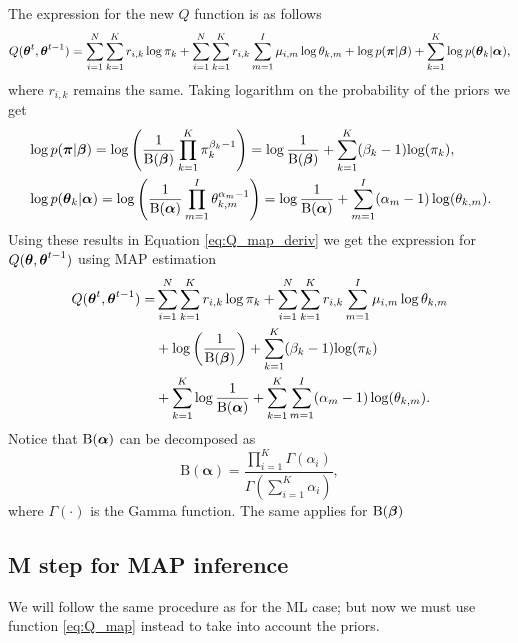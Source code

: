 \documentclass[12pt]{article}
\begin{document}
\noindent The expression for the new $Q$ function is as follows
\begin{equation}\label{eq:Q_map_deriv}
Q(\boldsymbol\theta^t, \boldsymbol\theta^{t-1}) = \sum_{i=1}^N\sum_{k=1}^K r_{i,k}\log \pi_k + \sum_{i=1}^N\sum_{k=1}^K r_{i,k}\sum_{m=1}^I \mu_{i,m}\log \theta_{k,m} + \log p(\boldsymbol\pi|\boldsymbol\beta) + \sum\limits_{k=1}^{K}\log p(\boldsymbol\theta_k|\boldsymbol\alpha),
\end{equation}
where $r_{i,k}$ remains the same. Taking logarithm on the probability of the priors we get
\begin{align}
& \log p(\boldsymbol\pi|\boldsymbol\beta) = \log \left (\dfrac{1}{\text{B}(\boldsymbol\beta)} \prod \limits_{k=1}^{K} \pi_{k}^{\beta_{k}-1} \right )= \log \dfrac{1}{\text{B}(\boldsymbol\beta)} + \sum \limits_{k=1}^{K}(\beta_{k}-1)\text{log}(\pi_{k}),\\
& \log p(\boldsymbol\theta_{k}|\boldsymbol\alpha) = \log \left(\dfrac{1}{\text{B}(\boldsymbol\alpha)} \prod \limits_{m=1}^{I} \theta_{k,m}^{\alpha_{m}-1}\right) = \log \dfrac{1}{\text{B}(\boldsymbol\alpha)} +  \sum \limits_{m=1}^{I}(\alpha_{m}-1)\log (\theta_{k,m}).
\end{align}
\noindent Using these results in Equation \ref{eq:Q_map_deriv} we get the expression for $Q(\boldsymbol\theta,\boldsymbol\theta^{t-1})$ using MAP estimation
\begin{equation}\label{eq:Q_map}
\begin{split}
Q(\boldsymbol\theta^t, \boldsymbol\theta^{t-1}) = & \sum_{i=1}^N\sum_{k=1}^K r_{i,k}\log \pi_k + \sum_{i=1}^N\sum_{k=1}^K r_{i,k}\sum_{m=1}^I \mu_{i,m}\log \theta_{k,m} \\
& + \log \left(\dfrac{1}{\text{B}(\boldsymbol\beta)}\right) + \sum \limits_{k=1}^{K}(\beta_{k}-1)\text{log}(\pi_{k})\\
 & + \sum\limits_{k=1}^{K} \log \dfrac{1}{\text{B}(\boldsymbol\alpha)} +  \sum\limits_{k=1}^{K}\sum \limits_{m=1}^{I}(\alpha_{m}-1)\log (\theta_{k,m}).
\end{split}
\end{equation}
Notice that $\text{B}(\boldsymbol\alpha)$ can be decomposed as $$
\mathrm { B } ( \boldsymbol { \alpha } ) = \frac { \prod _ { i = 1 } ^ { K } \Gamma \left( \alpha _ { i } \right) } { \Gamma \left( \sum _ { i = 1 } ^ { K } \alpha _ { i } \right) },
$$
where $\Gamma(\cdot)$ is the Gamma function. The same applies for $\text{B}(\boldsymbol\beta)$


\subsection{M step for MAP inference}

\noindent We will follow the same procedure as for the ML case; but now we must use function \ref{eq:Q_map} instead to take into account the priors.
\end{document}
